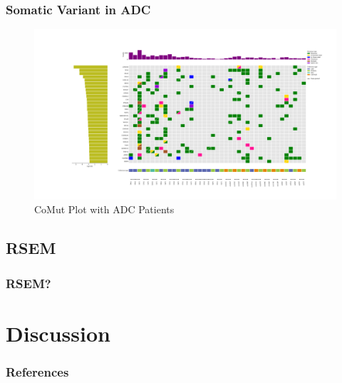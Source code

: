 \documentclass{beamer}
\begin{document}
    \begin{frame}
        \frametitle{Somatic Variant in ADC}

        \begin{figure}
            \includegraphics[width=\linewidth]{figures/Mutect2/Mutect2-ADC.pdf}
            \caption{CoMut Plot with ADC Patients}
        \end{figure}
    \end{frame}

    \subsection{RSEM}
    \begin{frame}
        \frametitle{RSEM?}
    \end{frame}

    \section{Discussion}

    \begin{frame}[allowframebreaks]
        \frametitle{References}
        
        
    \end{frame}
\end{document}
